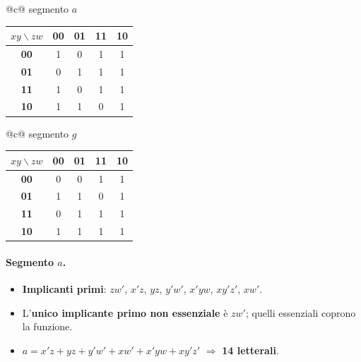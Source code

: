 \documentclass[12pt, a4paper]{article}
\begin{document}
\begin{center}
\renewcommand{\arraystretch}{1.25}
\begin{tabular}[t]{@{}c@{}}
segmento $a$\\[3pt]
\begin{tabular}[t]{|c|c|c|c|c|}
\hline
\colorbox{gray!25}{\color{black}$xy\backslash zw$} & \colorbox{gray!25}{\color{black}\textbf{00}} & \colorbox{gray!25}{\color{black}\textbf{01}} & \colorbox{gray!25}{\color{black}\textbf{11}} & \colorbox{gray!25}{\color{black}\textbf{10}} \\ \hline
\colorbox{gray!25}{\color{black}\textbf{00}} & 1 & 0 & 1 & 1 \\ \hline
\colorbox{gray!25}{\color{black}\textbf{01}} & 0 & 1 & 1 & 1 \\ \hline
\colorbox{gray!25}{\color{black}\textbf{11}} & 1 & 0 & 1 & 1 \\ \hline
\colorbox{gray!25}{\color{black}\textbf{10}} & 1 & 1 & 0 & 1 \\ \hline
\end{tabular}
\end{tabular}
\qquad
\begin{tabular}[t]{@{}c@{}}
segmento $g$\\[3pt]
\begin{tabular}[t]{|c|c|c|c|c|}
\hline
\colorbox{gray!25}{\color{black}$xy\backslash zw$} & \colorbox{gray!25}{\color{black}\textbf{00}} & \colorbox{gray!25}{\color{black}\textbf{01}} & \colorbox{gray!25}{\color{black}\textbf{11}} & \colorbox{gray!25}{\color{black}\textbf{10}} \\ \hline
\colorbox{gray!25}{\color{black}\textbf{00}} & 0 & 0 & 1 & 1 \\ \hline
\colorbox{gray!25}{\color{black}\textbf{01}} & 1 & 1 & 0 & 1 \\ \hline
\colorbox{gray!25}{\color{black}\textbf{11}} & 0 & 1 & 1 & 1 \\ \hline
\colorbox{gray!25}{\color{black}\textbf{10}} & 1 & 1 & 1 & 1 \\ \hline
\end{tabular}
\end{tabular}
\end{center}

\paragraph{Segmento $a$.}
\begin{itemize}
    \item \textbf{Implicanti primi}: $zw'$, $x'z$, $yz$, $y'w'$, $x'yw$, $xy'z'$, $xw'$.
    \item L'\textbf{unico implicante primo non essenziale} è $zw'$; quelli essenziali coprono la funzione.
    \item $a = x'z + yz + y'w' + xw' + x'yw + xy'z'$ \quad $\Rightarrow$ \textbf{14 letterali}.
\end{itemize}
\end{document}
